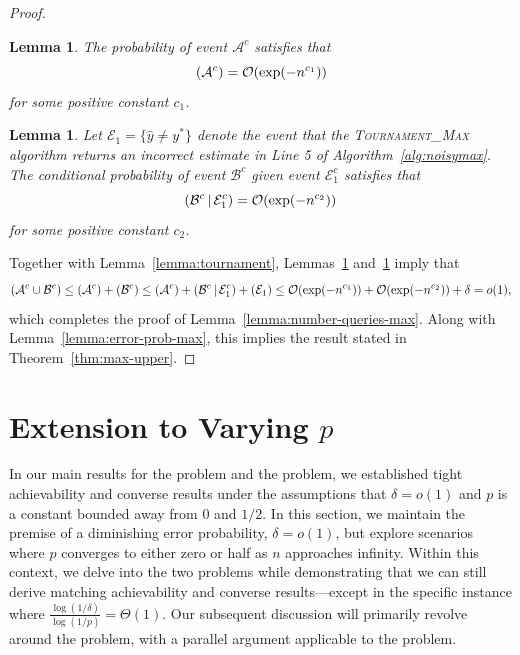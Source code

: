 \documentclass[journal, onecolumn]{IEEEtran}
\theoremstyle{plain}
\newtheorem{lemma}[theorem]{Lemma}
\theoremstyle{definition}
\theoremstyle{remark}
\def\ce{{\mathcal E}}
\def\ca{{\mathcal A}}
\def\cb{{\mathcal B}}
\def\co{{\mathcal O}}
\let\P\relax
\DeclareMathOperator\P{\mathsf{P}}
\newcommand{\cond}{\mathchoice{\,\vert\,}{\mspace{2mu}\vert\mspace{2mu}}{\vert}{\vert}}
\newcommand{\stourmax}{\textsc{Tournament\_Max }}
\begin{document}
\begin{proof}
    \begin{lemma} \label{lemma:event-A}
        The probability of event $\ca^c$ satisfies that
        \[
            \P(\ca^c)=\co(\exp(-n^{c_1}))
        \]
        for some positive constant $c_1$.
    \end{lemma}
    
    \begin{lemma} \label{lemma:event-B}
        Let $\ce_1 = \{\hat{y}\neq y^*\}$ denote the event that the \stourmax algorithm returns an incorrect estimate in Line 5 of Algorithm~\ref{alg:noisymax}. The conditional probability of event $\cb^c$ given event $\ce_1^c$ satisfies that 
        \[
            \P(\cb^c\cond \ce_1^c)=\co(\exp(-n^{c_2}))
        \]
        for some positive constant $c_2$.
    \end{lemma}
    
    \noindent Together with Lemma~\ref{lemma:tournament}, Lemmas~\ref{lemma:event-A} and~\ref{lemma:event-B} imply that 
    \[
        \P(\ca^c\cup\cb^c)\le \P(\ca^c)+\P(\cb^c)\le \P(\ca^c)+\P(\cb^c \cond \ce_1^c)+ \P(\ce_1)\le \co(\exp(-n^{c_1}))+\co(\exp(-n^{c_2})) + \delta=o(1),
    \]
    which completes the proof of Lemma~\ref{lemma:number-queries-max}. Along with Lemma~\ref{lemma:error-prob-max}, this implies the result stated in Theorem~\ref{thm:max-upper}.
\end{proof}


\section{Extension to Varying $p$} \label{sec:extension}
In our main results for the \orn problem and the \maxn problem, we established tight achievability and converse results under the assumptions that $\delta=o(1)$ and $p$ is a constant bounded away from $0$ and $1/2$. 
In this section, we maintain the premise of a diminishing error probability, $\delta=o(1)$, but explore scenarios where $p$ converges to either zero or half as $n$ approaches infinity. Within this context, we delve into the two problems while demonstrating that we can still derive matching achievability and converse results—except in the specific instance where $\frac{\log(1/\delta)}{\log(1/p)}=\Theta(1)$. Our subsequent discussion will primarily revolve around the \orn problem, with a parallel argument applicable to the \maxn problem.
\end{document}
